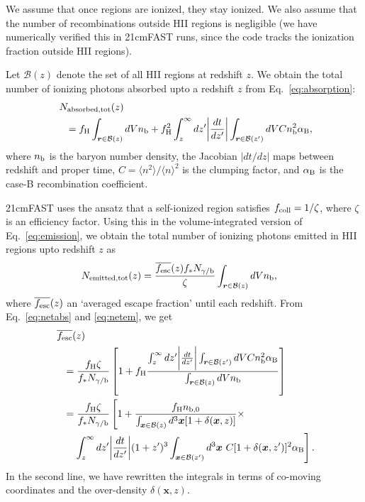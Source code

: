 We assume that once regions are ionized, they stay ionized. We also assume that the number of recombinations outside HII regions is negligible (we have numerically verified this in 21cmFAST runs, since the code tracks the ionization fraction outside HII regions). 

Let $\mathcal{B}(z)$ denote the set of all HII regions at redshift $z$. We obtain the total number of ionizing photons absorbed upto a redshift $z$ from Eq.~\eqref{eq:absorption}:
\begin{align}
~~~ & \!\!\!\!
  N_{\rm absorbed, tot}(z) \nonumber \\
  & = f_{\rm H} \int_{\bm r \in \mathcal{B}(z)} dV n_{\rm b} + f_{\rm H}^2 \int_z^\infty dz^\prime \biggr\vert \frac{dt}{dz^\prime} \biggr\vert \int_{\bm r \in \mathcal{B}(z^\prime)} dV C n_{\rm b}^2 \alpha_{\rm B}, \label{eq:netabs}
\end{align}
where $n_{\rm b}$ is the baryon number density, the Jacobian $\vert dt/dz \vert$ maps between redshift and proper time, $C = \langle n^2 \rangle/\langle n \rangle^2$ is the clumping factor, and $\alpha_{\rm B}$ is the case-B recombination coefficient.

21cmFAST uses the ansatz that a self-ionized region satisfies $f_{\rm coll} = 1/\zeta$, where $\zeta$ is an efficiency factor. Using this in the volume-integrated version of Eq.~\eqref{eq:emission}, we obtain the total number of ionizing photons emitted in HII regions upto redshift $z$ as
\begin{align}
  N_{\rm emitted, tot}(z) & = \frac{ \overline{f_{\rm esc}}(z) f_\ast N_{\gamma/{\rm b}} }{\zeta} \int_{\bm r \in \mathcal{B}(z)} dV  n_{\rm b}, \label{eq:netem}
\end{align}
where $\overline{f_{\rm esc}}(z)$ an `averaged escape fraction' until each redshift. From Eq.~\eqref{eq:netabs} and \eqref{eq:netem}, we get
\begin{align}
~~~ & \!\!\!\!
  \overline{f_{\rm esc}}(z) \nonumber \\
  & = \frac{f_{\rm H} \zeta}{ f_\ast N_{\gamma/{\rm b} } } \left[ 1 + f_{\rm H} \frac{ \int_z^\infty dz^\prime \biggr\vert \frac{dt}{dz^\prime} \biggr\vert \int_{\bm r \in \mathcal{B}(z^\prime)} dV C n_{\rm b}^2 \alpha_{\rm B} }{ \int_{\bm r \in \mathcal{B}(z)} dV n_{\rm b} } \right] \\
  & = \frac{f_{\rm H} \zeta}{ f_\ast N_{\gamma/{\rm b} } } \left[ 1 + \frac{ f_{\rm H} n_{\rm b, 0} }{ \int_{\bm x \in \mathcal{B}(z)} d^3 \bm{x} [1 + \delta(\bm x, z)] } \times \right. \nonumber \\
  & ~~~ \left. \int_z^\infty dz^\prime \biggr\vert \frac{dt}{dz^\prime} \biggr\vert (1 + z^\prime)^3 \int_{\bm x \in \mathcal{B}(z^\prime)} d^3 \bm{x} \ C [1 + \delta(\bm x, z^\prime)]^2 \alpha_{\rm B} \right] \mbox{.}
\end{align}
In the second line, we have rewritten the integrals in terms of co-moving coordinates and the over-density $\delta(\bm x, z)$. 

